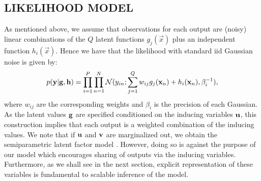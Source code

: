 \subsection{LIKELIHOOD MODEL}
As mentioned above, we assume that  observations for each output 
are  (noisy) linear combinations of the $Q$ latent functions $g_{j}(\vec{x})$ plus
an independent function $h_{i}(\vec{x})$. Hence we have that the likelihood 
with standard iid Gaussian noise is given by:
\begin{align}
p(\mathbf{y} | \mathbf{g}, \mathbf{h} ) = \prod_{i=1}^P \prod_{n=1}^N \mathcal{N}( y_{in} ; \sum_{j=1}^Q w_{ij} g_j(\mathbf{x}_n) + h_i(\mathbf{x}_n), \beta_i^{-1}),
\end{align}
where $w_{ij}$ are the corresponding weights and $\beta_i$ is the precision of each Gaussian.
As the latent values $\mathbf{g}$ are specified conditioned on the inducing variables $\mathbf{u}$, this construction implies that each output is a weighted combination of the inducing values.
We note that if $\mathbf{u}$ and $\mathbf{v}$ are marginalized out, we obtain the semiparametric latent factor model \citep{teh-et-al-aistats-05}.
However, doing so is against the purpose of our model which encourages sharing of outputs via the inducing variables.
Furthermore, as we shall see in the next section, explicit representation of these variables is fundamental to scalable inference of the model.

